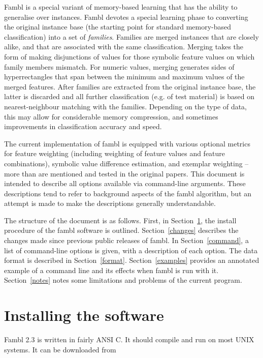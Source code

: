\documentclass[11pt]{article}
\begin{document}
{\sc Fambl} is a special variant of memory-based learning that has the
ability to generalise over instances. {\sc Fambl} devotes a special
learning phase to converting the original instance base (the starting
point for standard memory-based classification) into a set of {\sl
families}. Families are merged instances that are closely alike, and
that are associated with the same classification. Merging takes the
form of making disjunctions of values for those symbolic feature
values on which family members mismatch. For numeric values, merging
generates sides of hyperrectangles that span between the minimum and
maximum values of the merged features. After families are extracted
from the original instance base, the latter is discarded and all
further classification (e.g. of test material) is based on
nearest-neighbour matching with the families. Depending on the type of
data, this may allow for considerable memory compression, and
sometimes improvements in classification accuracy and speed.

The current implementation of {\sc fambl} is equipped with various
optional metrics for feature weighting (including weighting of feature
values and feature combinations), symbolic value difference
estimation, and exemplar weighting -- more than are mentioned and
tested in the original papers. This document is intended to
describe all options available via command-line arguments. These
descriptions tend to refer to background aspects of the {\sc fambl}
algorithm, but an attempt is made to make the descriptions generally
understandable.

The structure of the document is as follows. First, in
Section~\ref{install}, the install procedure of the {\sc fambl}
software is outlined. Section~\ref{changes} describes the changes made
since previous public releases of {\sc fambl}. In
Section~\ref{command}, a list of command-line options is given, with a
description of each option. The data format is described in
Section~\ref{format}. Section~\ref{examples} provides an annotated
example of a command line and its effects when {\sc fambl} is run with
it.  Section~\ref{notes} notes some limitations and problems of the
current program.

\section{Installing the software}
\label{install}

{\sc Fambl} 2.3 is written in fairly ANSI C.  It should compile and
run on most UNIX systems. It can be downloaded from
\end{document}
